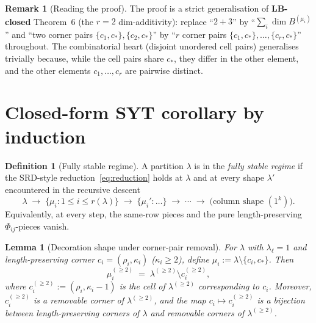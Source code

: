 \documentclass[11pt]{article}
\newtheorem{lemma}[theorem]{Lemma}
\theoremstyle{definition}
\newtheorem{definition}[theorem]{Definition}
\newtheorem{remark}[theorem]{Remark}
\begin{document}
\begin{remark}[Reading the proof]\label{rem:reading}
The proof is a strict generalisation of \textbf{LB-closed} Theorem~6
(the $r = 2$ dim-additivity): replace ``$2 + 3$'' by
``$\sum_i \dim B^{(\mu_i)}$'' and ``two corner pairs $\{c_1, c_*\},
\{c_2, c_*\}$'' by ``$r$ corner pairs $\{c_1, c_*\}, \ldots, \{c_r, c_*\}$''
throughout. The combinatorial heart (disjoint unordered cell pairs)
generalises trivially because, while the cell pairs share $c_*$, they
differ in the other element, and the other elements $c_1, \ldots, c_r$
are pairwise distinct.
\end{remark}

\section{Closed-form SYT corollary by induction}\label{sec:syt-corollary}

\begin{definition}[Fully stable regime]\label{def:fully-stable}
A partition $\lambda$ is in the \emph{fully stable regime} if the
SRD-style reduction~\eqref{eq:reduction} holds at $\lambda$ and at
every shape $\lambda'$ encountered in the recursive descent
\[
   \lambda \;\longrightarrow\; \{\mu_i : 1 \le i \le r(\lambda)\}
   \;\longrightarrow\; \{\mu_i' : \ldots\} \;\longrightarrow\;
   \cdots \;\longrightarrow\; \text{(column shape $(1^k)$)}.
\]
Equivalently, at every step, the same-row pieces and the pure
length-preserving $\Phi_{ij}$-pieces vanish.
\end{definition}

\begin{lemma}[Decoration shape under corner-pair removal]\label{lem:decoration-removal}
For $\lambda$ with $\lambda_\ell = 1$ and length-preserving corner
$c_i = (\rho_i, \kappa_i)$ ($\kappa_i \ge 2$), define
$\mu_i := \lambda \setminus \{c_i, c_*\}$. Then
\[
   \mu_i^{(\ge 2)} \;=\; \lambda^{(\ge 2)} \setminus c_i^{(\ge 2)},
\]
where $c_i^{(\ge 2)} := (\rho_i, \kappa_i - 1)$ is the cell of
$\lambda^{(\ge 2)}$ corresponding to $c_i$. Moreover,
$c_i^{(\ge 2)}$ is a removable corner of $\lambda^{(\ge 2)}$, and the
map $c_i \mapsto c_i^{(\ge 2)}$ is a bijection between
length-preserving corners of $\lambda$ and removable corners of
$\lambda^{(\ge 2)}$.
\end{lemma}
\end{document}
